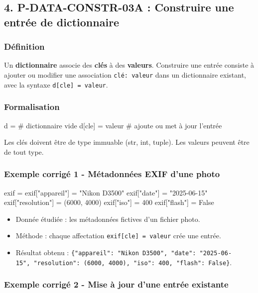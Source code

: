 \subsection{4. P-DATA-CONSTR-03A : Construire une entrée de dictionnaire}

\subsubsection{Définition}

Un \textbf{dictionnaire} associe des \textbf{clés} à des
\textbf{valeurs}. Construire une entrée consiste à ajouter ou modifier
une association \texttt{clé:\ valeur} dans un dictionnaire existant,
avec la syntaxe \texttt{d{[}cle{]}\ =\ valeur}.

\subsubsection{Formalisation}

\begin{python}
d = {}              # dictionnaire vide
d[cle] = valeur     # ajoute ou met à jour l'entrée
\end{python}

Les clés doivent être de type immuable (str, int, tuple). Les valeurs
peuvent être de tout type.

\subsubsection{Exemple corrigé 1 - Métadonnées EXIF d’une photo}

\begin{python}
exif = {}
exif["appareil"] = "Nikon D3500"
exif["date"] = "2025-06-15"
exif["resolution"] = (6000, 4000)
exif["iso"] = 400
exif["flash"] = False
\end{python}

\begin{itemize}
\tightlist
\item
  Donnée étudiée : les métadonnées fictives d'un fichier photo.
\item
  Méthode : chaque affectation \texttt{exif{[}cle{]}\ =\ valeur} crée
  une entrée.
\item
  Résultat obtenu :
  \texttt{\{"appareil":\ "Nikon\ D3500",\ "date":\ "2025-06-15",\ "resolution":\ (6000,\ 4000),\ "iso":\ 400,\ "flash":\ False\}}.
\end{itemize}

\subsubsection{Exemple corrigé 2 - Mise à jour d’une entrée existante}

